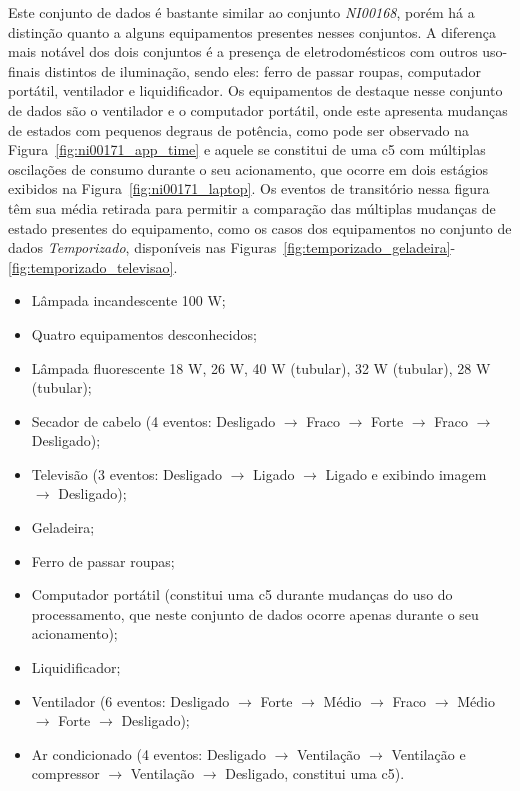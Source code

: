 Este conjunto de dados é bastante similar ao conjunto \emph{NI00168},
porém há a distinção quanto a alguns equipamentos presentes nesses
conjuntos. A diferença mais notável dos dois conjuntos é a presença de
eletrodomésticos com outros uso-finais distintos de iluminação, sendo
eles: ferro de passar roupas, computador portátil, ventilador e
liquidificador.  Os equipamentos de destaque nesse conjunto de dados
são o ventilador e o computador portátil, onde este apresenta mudanças
de estados com pequenos degraus de potência, como pode ser observado
na Figura~\ref{fig:ni00171_app_time} e aquele se constitui de uma
\acs{c5} com múltiplas oscilações de consumo durante o seu
acionamento, que ocorre em dois estágios exibidos na
Figura~\ref{fig:ni00171_laptop}. Os eventos de transitório nessa
figura têm sua média retirada para permitir a comparação das múltiplas
mudanças de estado presentes do equipamento, como os casos dos
equipamentos no conjunto de dados \emph{Temporizado}, disponíveis nas
Figuras~\ref{fig:temporizado_geladeira}-\ref{fig:temporizado_televisao}.

\begin{itemize}
\item Lâmpada incandescente 100 W;
\item Quatro equipamentos desconhecidos;
\item Lâmpada fluorescente 18 W, 26 W, 40 W (tubular), 32 W (tubular),
28 W (tubular);
\item Secador de cabelo (4 eventos: Desligado $\rightarrow$ Fraco
$\rightarrow$ Forte $\rightarrow$ Fraco $\rightarrow$ Desligado);
\item Televisão (3 eventos: Desligado $\rightarrow$ Ligado
$\rightarrow$ Ligado e exibindo imagem $\rightarrow$
Desligado);
\item Geladeira;
\item Ferro de passar roupas;
\item Computador portátil (constitui uma \acs{c5} durante mudanças do
uso do processamento, que neste conjunto de dados ocorre apenas
durante o seu acionamento);
\item Liquidificador;
\item Ventilador (6 eventos: Desligado $\rightarrow$ Forte $\rightarrow$
Médio $\rightarrow$ Fraco $\rightarrow$ Médio $\rightarrow$ Forte
$\rightarrow$ Desligado);
\item Ar condicionado (4 eventos: Desligado $\rightarrow$ Ventilação
$\rightarrow$ Ventilação e compressor $\rightarrow$ Ventilação
$\rightarrow$ Desligado, constitui uma \acs{c5}).
\end{itemize}

